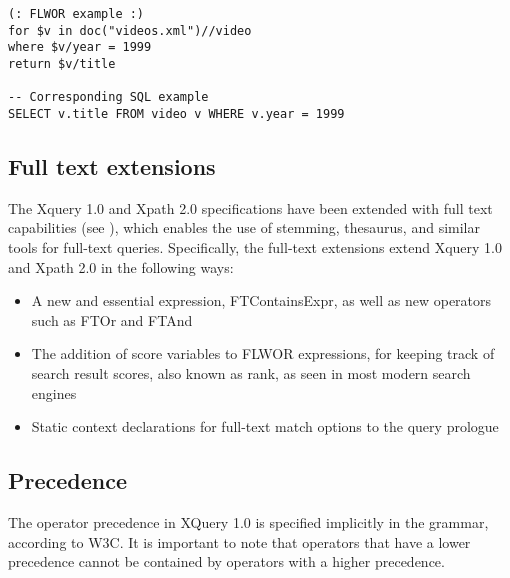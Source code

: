 \begin{verbatim}
(: FLWOR example :)
for $v in doc("videos.xml")//video
where $v/year = 1999
return $v/title

-- Corresponding SQL example 
SELECT v.title FROM video v WHERE v.year = 1999
\end{verbatim}

\subsection{Full text extensions}
The Xquery 1.0  and Xpath 2.0 specifications have been extended with full text capabilities (see \cite{w3c02}), which enables the use of stemming, thesaurus, and similar tools for full-text queries. Specifically, the full-text extensions extend Xquery 1.0 and Xpath 2.0 in the following ways:
\begin{itemize}
\item A new and essential expression, FTContainsExpr, as well as new operators such as FTOr and FTAnd
\item The addition of score variables to FLWOR expressions, for keeping track of search result scores, also known as rank, as seen in most modern search engines
\item Static context declarations for full-text match options to the query prologue
\end{itemize}

\subsection{Precedence}
\label{sect:xquery:precedence}
The operator precedence in XQuery 1.0 is specified implicitly in the grammar,
according to W3C\cite{w3cprecedence}. It is important to note that operators that 
have a lower precedence cannot be contained by operators with a higher 
precedence.
